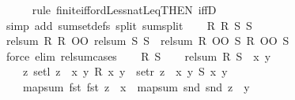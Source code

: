 \begin{isabellebody}
\ \ \ \ \isamarkupfalse%
\ {\isacharparenleft}{\kern0pt}rule\ finite{\isacharunderscore}{\kern0pt}iff{\isacharunderscore}{\kern0pt}ordLess{\isacharunderscore}{\kern0pt}natLeq{\isacharbrackleft}{\kern0pt}THEN\ iffD{}{\isacharbrackright}{\kern0pt}{\isacharparenright}{\kern0pt}\isanewline
\ \ \ \ \isamarkupfalse%
\ {\isacharparenleft}{\kern0pt}simp\ add{\isacharcolon}{\kern0pt}\ sum{\isacharunderscore}{\kern0pt}set{\isacharunderscore}{\kern0pt}defs{\isacharparenleft}{\kern0pt}{}{\isacharparenright}{\kern0pt}\ split{\isacharcolon}{\kern0pt}\ sum{\isachardot}{\kern0pt}split{\isacharparenright}{\kern0pt}\isanewline
{}\isamarkupfalse%
\isanewline
\ \ \isamarkupfalse%
\ R{}\ R{}\ S{}\ S{}\isanewline
\ \ \isamarkupfalse%
\ {\isachardoublequoteopen}rel{\isacharunderscore}{\kern0pt}sum\ R{}\ R{}\ OO\ rel{\isacharunderscore}{\kern0pt}sum\ S{}\ S{}\ {\isasymle}\ rel{\isacharunderscore}{\kern0pt}sum\ {\isacharparenleft}{\kern0pt}R{}\ OO\ S{}{\isacharparenright}{\kern0pt}\ {\isacharparenleft}{\kern0pt}R{}\ OO\ S{}{\isacharparenright}{\kern0pt}{\isachardoublequoteclose}\isanewline
\ \ \ \ \isamarkupfalse%
\ {\isacharparenleft}{\kern0pt}force\ elim{\isacharcolon}{\kern0pt}\ rel{\isacharunderscore}{\kern0pt}sum{\isachardot}{\kern0pt}cases{\isacharparenright}{\kern0pt}\isanewline
{}\isamarkupfalse%
\isanewline
\ \ \isamarkupfalse%
\ R\ S\isanewline
\ \ \isamarkupfalse%
\ {\isachardoublequoteopen}rel{\isacharunderscore}{\kern0pt}sum\ R\ S\ {\isacharequal}{\kern0pt}\ {\isacharparenleft}{\kern0pt}{\isasymlambda}x\ y{\isachardot}{\kern0pt}\isanewline
\ \ \ \ {\isasymexists}z{\isachardot}{\kern0pt}\ {\isacharparenleft}{\kern0pt}setl\ z\ {\isasymsubseteq}\ {\isacharbraceleft}{\kern0pt}{\isacharparenleft}{\kern0pt}x{\isacharcomma}{\kern0pt}\ y{\isacharparenright}{\kern0pt}{\isachardot}{\kern0pt}\ R\ x\ y{\isacharbraceright}{\kern0pt}\ {\isasymand}\ setr\ z\ {\isasymsubseteq}\ {\isacharbraceleft}{\kern0pt}{\isacharparenleft}{\kern0pt}x{\isacharcomma}{\kern0pt}\ y{\isacharparenright}{\kern0pt}{\isachardot}{\kern0pt}\ S\ x\ y{\isacharbraceright}{\kern0pt}{\isacharparenright}{\kern0pt}\ {\isasymand}\isanewline
\ \ \ \ map{\isacharunderscore}{\kern0pt}sum\ fst\ fst\ z\ {\isacharequal}{\kern0pt}\ x\ {\isasymand}\ map{\isacharunderscore}{\kern0pt}sum\ snd\ snd\ z\ {\isacharequal}{\kern0pt}\ y{\isacharparenright}{\kern0pt}{\isachardoublequoteclose}\isanewline

\end{isabellebody}
